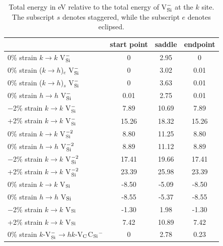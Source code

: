 \documentclass[aps,prb,preprint,superscriptaddress]{revtex4-1}
\begin{document}
\begin{table}[ht!]
\caption{ Total energy in eV relative to the total energy of V$_{\rm Si}^-$ at the $k$ site. The subscript $s$ denotes staggered, while the subscript $e$ denotes eclipsed.} 
\centering
\vspace{1 mm}
\begin{tabular}{|l|c|c|c|}
\hline\hline
 & start point & saddle & endpoint \\
\hline
0\% strain $k\rightarrow k$ V$_{\rm Si}^-$ & 0 & 2.95 & 0\\
\hline
0\% strain ($k\rightarrow h$)$_e$ V$_{\rm Si}^-$ & 0 & 3.02 & 0.01\\
\hline
0\% strain ($k\rightarrow h$)$_s$ V$_{\rm Si}^-$ & 0 & 3.63 & 0.01\\
\hline
0\% strain $h\rightarrow h$ V$_{\rm Si}^-$ & 0.01 & 2.75 & 0.01\\
\hline
$-$2\% strain $k\rightarrow k$ V$_{\rm Si}^-$ & 7.89 & 10.69 & 7.89\\
\hline
+2\% strain $k\rightarrow k$ V$_{\rm Si}^-$ & 15.26 & 18.32 & 15.26\\
\hline
0\% strain $k\rightarrow k$ V$_{\rm Si}^{-2}$ & 8.80 & 11.25 & 8.80\\
\hline
0\% strain $h\rightarrow h$ V$_{\rm Si}^{-2}$ & 8.89 & 11.12 & 8.89\\
\hline
$-$2\% strain $k\rightarrow k$ V$_{\rm Si}^{-2}$ & 17.41 & 19.66 & 17.41\\
\hline
+2\% strain $k\rightarrow k$ V$_{\rm Si}^{-2}$ & 23.39 & 25.98 & 23.39\\
\hline
0\% strain $k\rightarrow k$ V$_{\rm Si}$ & -8.50 & -5.09 & -8.50\\
\hline
0\% strain $h\rightarrow h$ V$_{\rm Si}$ & -8.55 & -5.37 & -8.55\\
\hline
$-$2\% strain $k\rightarrow k$ V$_{\rm Si}$ & -1.30 & 1.98 & -1.30\\
\hline
+2\% strain $k\rightarrow k$ V$_{\rm Si}$ & 7.42 & 10.89 & 7.42\\
\hline
0\% strain $k$-V$_{\rm Si}^-$$\rightarrow hk$-{V$_{\rm C}$C$_{\rm Si}$}$^-$ & 0 & 2.78 & 0.23\\
\hline
\hline
\end{tabular}
\label{tab:barriers}
\end{table}
\end{document}
